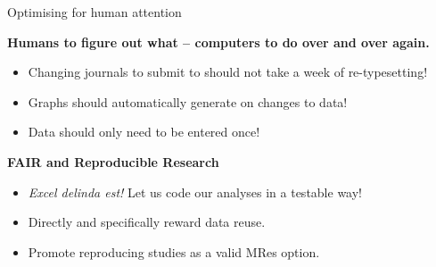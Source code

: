 \documentclass[aspectratio=169, 11pt]{beamer} %
\begin{document}

{%
\begin{frame}{Optimising for human attention}


\textbf{Humans to figure out what -- computers to do over and over again.}

\begin{itemize}
    \item Changing journals to submit to should not take a week of re-typesetting!
    \item Graphs should automatically generate on changes to data! 
    \item Data should only need to be entered once!
\end{itemize}




\textbf{FAIR and Reproducible Research}

\begin{itemize}
    \item \textit{Excel delinda est!} Let us code our analyses in a testable way! \parencite{Krugman2013-ju, Ross2020-yg, Bruford2020-tw}
    \item Directly and specifically reward data reuse.
    \item Promote reproducing studies as a valid MRes option. \parencite{Spring2018-kr}
\end{itemize}



\end{frame}}
\end{document}
